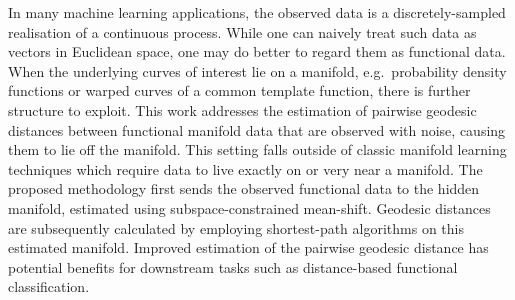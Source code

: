 In many machine learning applications, the observed data is a
discretely-sampled realisation of a continuous process. While one can
naively treat such data as vectors in Euclidean space, one may do better
to regard them as functional data.  
When the underlying curves of interest lie on a manifold, e.g.~probability density
functions or warped curves of a common template function, there is further structure to exploit. 
This work addresses the estimation of pairwise geodesic
distances between functional manifold data that are observed with noise,
causing them to lie off the manifold. This setting falls outside of
classic manifold learning techniques which require data to live exactly
on or very near a manifold. The proposed methodology first sends the
observed functional data to the hidden manifold, estimated using
subspace-constrained mean-shift. Geodesic distances are subsequently
calculated by employing shortest-path algorithms on this estimated
manifold. Improved estimation of the pairwise geodesic distance has
potential benefits for downstream tasks such as distance-based functional classification.